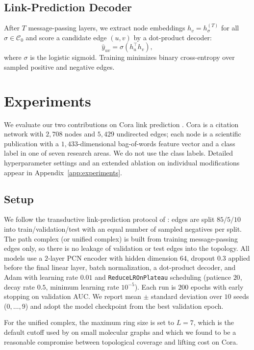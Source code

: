 \documentclass[letterpaper]{article} %
\begin{document}
\subsection{Link-Prediction Decoder} \label{subsec:decoder}
After \(T\) message-passing layers, we extract node embeddings \(h_v = h_\sigma^{(T)}\) for all \(\sigma \in \mathcal{C}_0\) and score a candidate edge \((u, v)\) by a dot-product decoder:
\[
    \hat{y}_{uv} = \sigma\left( h_u^\top h_v \right),
\]
where \(\sigma\) is the logistic sigmoid. Training minimizes binary cross-entropy over sampled positive and negative edges.

\section{Experiments} \label{section:experiments}

We evaluate our two contributions on Cora link prediction \cite{sen_collective_2008, kipf_variational_2016}. Cora is a citation network with \(2,\!708\) nodes and \(5,\!429\) undirected edges; each node is a scientific publication with a \(1,\!433\)-dimensional bag-of-words feature vector and a class label in one of seven research areas. We do not use the class labels. Detailed hyperparameter settings and an extended ablation on individual modifications appear in Appendix~\ref{app:experiments}.

\subsection{Setup} \label{subsec:setup}
We follow the transductive link-prediction protocol of \cite{kipf_variational_2016}: edges are split \(85/5/10\) into train/validation/test with an equal number of sampled negatives per split. The path complex (or unified complex) is built from training message-passing edges only, so there is no leakage of validation or test edges into the topology. All models use a \(2\)-layer PCN encoder with hidden dimension \(64\), dropout \(0.3\) applied before the final linear layer, batch normalization, a dot-product decoder, and Adam \cite{kingma_adam_2015} with learning rate \(0.01\) and \texttt{ReduceLROnPlateau} scheduling (patience \(20\), decay rate \(0.5\), minimum learning rate \(10^{-5}\)). Each run is \(200\) epochs with early stopping on validation AUC. We report mean \(\pm\) standard deviation over \(10\) seeds (\(0, \ldots, 9\)) and adopt the model checkpoint from the best validation epoch.

For the unified complex, the maximum ring size is set to \(L = 7\), which is the default cutoff used by \cite{bodnar_weisfeiler_2022} on small molecular graphs and which we found to be a reasonable compromise between topological coverage and lifting cost on Cora.
\end{document}
